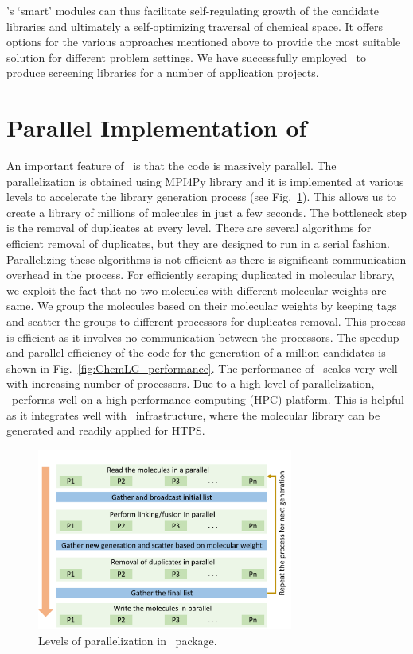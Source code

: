 \chemlg 's `smart' modules can thus facilitate self-regulating growth of the candidate libraries and ultimately a self-optimizing traversal of chemical space. It offers options for the various approaches mentioned above to provide the most suitable solution for different problem settings. We have successfully employed \chemlg\ to produce screening libraries for a number of application projects.


\section{Parallel Implementation of \chemlg}

An important feature of \chemlg\ is that the code is massively parallel. The parallelization is obtained using MPI4Py library and it is implemented at various levels to accelerate the library generation process (see Fig.\ \ref{fig:ChemLG_parallel}). This allows us to create a library of millions of molecules in just a few seconds. The bottleneck step is the removal of duplicates at every level. There are several algorithms for efficient removal of duplicates, but they are designed to run in a serial fashion. Parallelizing these algorithms is not efficient as there is significant communication overhead in the process. For efficiently scraping duplicated in molecular library, we exploit the fact that no two molecules with different molecular weights are same. We group the molecules based on their molecular weights by keeping tags and scatter the groups to different processors for duplicates removal. This process is efficient as it involves no communication between the processors. The speedup and parallel efficiency of the code for the generation of a million candidates is shown in Fig.\ \ref{fig:ChemLG_performance}. The performance of \chemlg\ scales very well with increasing number of processors. Due to a high-level of parallelization, \chemlg\ performs well on a high performance computing (HPC) platform. This is helpful as it integrates well with \chemhtps\ infrastructure, where the molecular library can be generated and readily applied for HTPS.

\begin{figure}[htbp]
	\centering
	\includegraphics[width=0.75\textwidth]{Chapter-4/Figures/ChemLG_parallel.png}
	\caption{Levels of parallelization in \chemlg\  package.} 
	\label{fig:ChemLG_parallel} 
\end{figure}  

